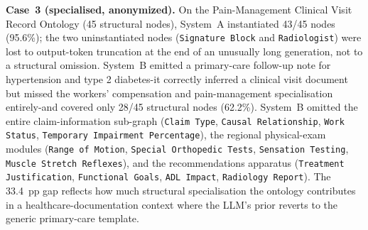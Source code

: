 \documentclass[runningheads,a4paper]{llncs}
\begin{document}
\medskip{}

\medskip\noindent\textbf{Case~3 (specialised, anonymized).} On the Pain-Management
Clinical Visit Record Ontology (45 structural nodes), System~A
instantiated 43/45 nodes (95.6\%); the two uninstantiated nodes
(\texttt{Signature Block} and \texttt{Radiologist}) were lost to
output-token truncation at the end of an unusually long generation,
not to a structural omission. System~B emitted a primary-care
follow-up note for hypertension and type 2 diabetes-it correctly
inferred a clinical visit document but missed the workers'
compensation and pain-management specialisation entirely-and
covered only 28/45 structural nodes (62.2\%). System~B omitted the
entire claim-information sub-graph (\texttt{Claim Type},
\texttt{Causal Relationship}, \texttt{Work Status},
\texttt{Temporary Impairment Percentage}), the regional physical-exam
modules (\texttt{Range of Motion}, \texttt{Special Orthopedic Tests},
\texttt{Sensation Testing}, \texttt{Muscle Stretch Reflexes}), and
the recommendations apparatus (\texttt{Treatment Justification},
\texttt{Functional Goals}, \texttt{ADL Impact},
\texttt{Radiology Report}). The 33.4~pp gap reflects how much
structural specialisation the ontology contributes in a
healthcare-documentation context where the LLM's prior reverts to
the generic primary-care template.
\end{document}
